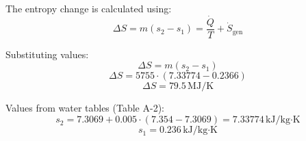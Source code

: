 The entropy change is calculated using:  
\[
\Delta S = m (s_2 - s_1) = \frac{\dot{Q}}{T} + \dot{S}_{\text{gen}}
\]  

Substituting values:  
\[
\Delta S = m (s_2 - s_1)
\]  
\[
\Delta S = 5755 \cdot (7.33774 - 0.2366)
\]  
\[
\Delta S = 79.5 \, \text{MJ/K}
\]  

Values from water tables (Table A-2):  
\[
s_2 = 7.3069 + 0.005 \cdot (7.354 - 7.3069) = 7.33774 \, \text{kJ/kg·K}
\]  
\[
s_1 = 0.236 \, \text{kJ/kg·K}
\]